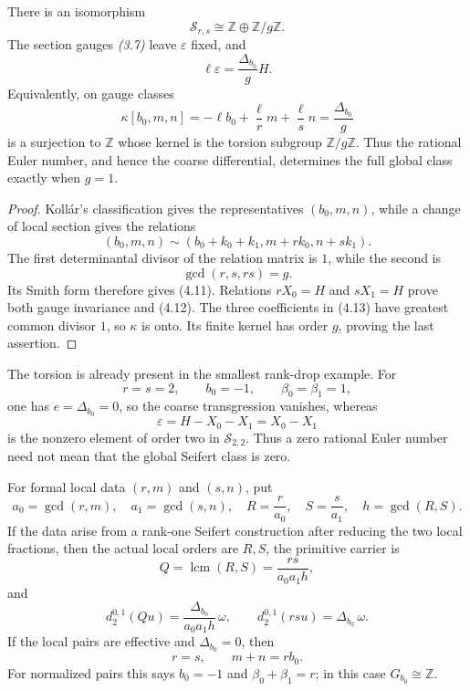 \documentclass[11pt]{article}
\numberwithin{equation}{section}
\begin{document}
\begin{proposition}
There is an isomorphism
\[
                  \mathcal S_{r,s}\cong
                  \mathbb Z\oplus\mathbb Z/g\mathbb Z.          \tag{4.11}
\]
The section gauges \emph{(3.7)} leave $\varepsilon$ fixed, and
\[
                 \ell\varepsilon=\frac{\Delta_{b_0}}gH.         \tag{4.12}
\]
Equivalently, on gauge classes
\[
 \kappa[b_0,m,n]
   =-\ell b_0+\frac{\ell}{r}m+\frac{\ell}{s}n
   =\frac{\Delta_{b_0}}g                                      \tag{4.13}
\]
is a surjection to $\mathbb Z$ whose kernel is the torsion subgroup
$\mathbb Z/g\mathbb Z$.  Thus the rational Euler number, and hence the
coarse differential, determines the full global class exactly when $g=1$.
\end{proposition}

\begin{proof}
Koll\'ar's classification gives the representatives $(b_0,m,n)$, while a
change of local section gives the relations
\[
 (b_0,m,n)\sim(b_0+k_0+k_1,m+rk_0,n+sk_1).
\]
The first determinantal divisor of the relation matrix is $1$, while the
second is
\[
                         \gcd(r,s,rs)=g.
\]
Its Smith form therefore gives (4.11).  Relations $rX_0=H$ and $sX_1=H$
prove both gauge invariance and (4.12).  The three coefficients in (4.13)
have greatest common divisor $1$, so $\kappa$ is onto.  Its finite kernel has
order $g$, proving the last assertion.
\end{proof}

The torsion is already present in the smallest rank-drop example.  For
\[
 r=s=2,\qquad b_0=-1,\qquad \beta_0=\beta_1=1,                 \tag{4.14}
\]
one has $e=\Delta_{b_0}=0$, so the coarse transgression vanishes, whereas
\[
 \varepsilon=H-X_0-X_1=X_0-X_1
\]
is the nonzero element of order two in $\mathcal S_{2,2}$.  Thus a zero
rational Euler number need not mean that the global Seifert class is zero.

\begin{proposition}
For formal local data $(r,m)$ and $(s,n)$, put
\[
 a_0=\gcd(r,m),\quad a_1=\gcd(s,n),\quad
 R=\frac r{a_0},\quad S=\frac s{a_1},\quad h=\gcd(R,S).          \tag{4.15}
\]
If the data arise from a rank-one Seifert construction after reducing the
two local fractions, then the actual local orders are $R,S$, the primitive
carrier is
\[
 Q=\operatorname{lcm}(R,S)=\frac{rs}{a_0a_1h},                  \tag{4.16}
\]
and
\[
       d_2^{0,1}(Qu)=\frac{\Delta_{b_0}}{a_0a_1h}\,\omega,
       \qquad d_2^{0,1}(rsu)=\Delta_{b_0}\,\omega.              \tag{4.17}
\]
If the local pairs are effective and $\Delta_{b_0}=0$, then
\[
                 r=s,\qquad m+n=rb_0.                            \tag{4.18}
\]
For normalized pairs this says $b_0=-1$ and
$\beta_0+\beta_1=r$; in this case $G_{b_0}\cong\mathbb Z$.
\end{proposition}
\end{document}
